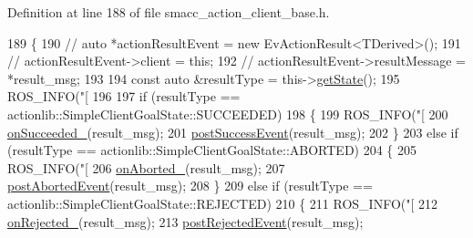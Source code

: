 Definition at line 188 of file smacc\+\_\+action\+\_\+client\+\_\+base.\+h.


\begin{DoxyCode}
189     \{
190         \textcolor{comment}{// auto *actionResultEvent = new EvActionResult<TDerived>();}
191         \textcolor{comment}{// actionResultEvent->client = this;}
192         \textcolor{comment}{// actionResultEvent->resultMessage = *result\_msg;}
193 
194         \textcolor{keyword}{const} \textcolor{keyword}{auto} &resultType = this->\hyperlink{classsmacc_1_1client__bases_1_1SmaccActionClientBase_a97192acd7bb7cac5de0191e700ab72ee}{getState}();
195         ROS\_INFO(\textcolor{stringliteral}{"[%
196 
197         \textcolor{keywordflow}{if} (resultType == actionlib::SimpleClientGoalState::SUCCEEDED)
198         \{
199             ROS\_INFO(\textcolor{stringliteral}{"[%
200             \hyperlink{classsmacc_1_1client__bases_1_1SmaccActionClientBase_afa1d615e16c9e825d815a3a3ccaa61df}{onSucceeded\_}(result\_msg);
201             \hyperlink{classsmacc_1_1client__bases_1_1SmaccActionClientBase_afb4f82508cd653d496392f321e84a783}{postSuccessEvent}(result\_msg);
202         \}
203         \textcolor{keywordflow}{else} \textcolor{keywordflow}{if} (resultType == actionlib::SimpleClientGoalState::ABORTED)
204         \{
205             ROS\_INFO(\textcolor{stringliteral}{"[%
206             \hyperlink{classsmacc_1_1client__bases_1_1SmaccActionClientBase_adc33748ca4fcef9730f8039b75d496d0}{onAborted\_}(result\_msg);
207             \hyperlink{classsmacc_1_1client__bases_1_1SmaccActionClientBase_a9ca2952ededeec233ee6d8a9a39c680b}{postAbortedEvent}(result\_msg);
208         \}
209         \textcolor{keywordflow}{else} \textcolor{keywordflow}{if} (resultType == actionlib::SimpleClientGoalState::REJECTED)
210         \{
211             ROS\_INFO(\textcolor{stringliteral}{"[%
212             \hyperlink{classsmacc_1_1client__bases_1_1SmaccActionClientBase_a4c878cbf2684701323e2b36668f7d721}{onRejected\_}(result\_msg);
213             \hyperlink{classsmacc_1_1client__bases_1_1SmaccActionClientBase_a04cb60c48127e5534c1ce7045fb5abdc}{postRejectedEvent}(result\_msg);
}}}}
\end{DoxyCode}
